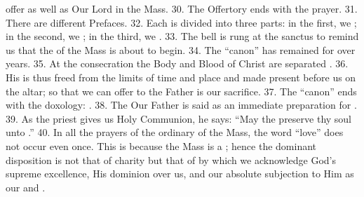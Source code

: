 \documentclass[a4paper,14pt]{memoir}
\newcommand\answer[1]{\textbf{\textit{#1}}}
\begin{document}
offer \answer{} as well as Our Lord in the Mass. 
30. The Offertory ends  with
the \answer{} prayer. 
31. There are \answer{} different Prefaces. 
32. Each  is
divided into three parts: in the first,  we  \answer{};  in  the  second,  we
\answer{}; in the third, we \answer{}. 
33. The bell is rung at the sanctus  to
remind us that the \answer{} of the Mass is about to begin. 
34.  The  “canon”
has remained for over \answer{} years. 
35. At the consecration the  Body  and
Blood of Christ are separated \answer{}. 
36. His \answer{} is thus freed  from
the limits of time and place and made present before us  on  the  altar;  so
that we can offer to the Father is our sacrifice. 
37. The “canon” ends  with
the doxology:  \answer{}.  
38.  The  Our  Father  is  said  as  an  immediate
preparation for \answer{}. 
39. As the priest  gives  us  Holy  Communion,  he
says: “May the \answer{} preserve thy soul unto \answer{}.”  
40.  In  all  the
prayers of the ordinary of the Mass, the word “love”  does  not  occur  even
once.  This  is  because  the  Mass  is  a  \answer{};  hence  the   dominant
disposition is not that  of  charity  but  that  of  \answer{}  by  which  we
acknowledge  God's  supreme  excellence,  His  dominion  over  us,  and  our
absolute subjection to Him as our \answer{} \answer{} and \answer{}.
\end{document}
